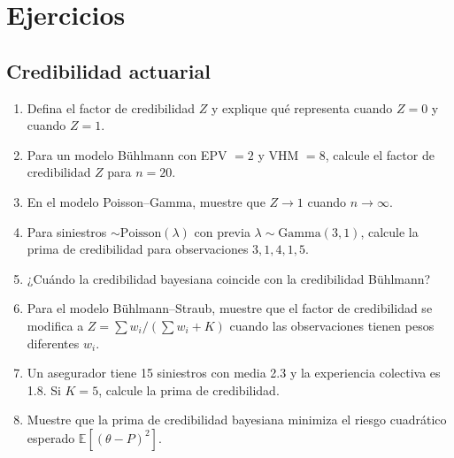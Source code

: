 \section{Ejercicios}

\subsection*{Credibilidad actuarial}
\begin{enumerate}
	\item[$\star$] Defina el factor de credibilidad $Z$ y explique qué representa cuando $Z = 0$ y cuando $Z = 1$.
	\item[$\star\star$] Para un modelo Bühlmann con EPV $= 2$ y VHM $= 8$, calcule el factor de credibilidad $Z$ para $n = 20$.
	\item[$\star\star\star$] En el modelo Poisson--Gamma, muestre que $Z \to 1$ cuando $n \to \infty$.
	\item[$\star\star$] Para siniestros $\sim \mathrm{Poisson}(\lambda)$ con previa $\lambda \sim \mathrm{Gamma}(3, 1)$, calcule la prima de credibilidad para observaciones $3, 1, 4, 1, 5$.
	\item[$\star\star$] ¿Cuándo la credibilidad bayesiana coincide con la credibilidad Bühlmann?
	\item[$\star\star\star$] Para el modelo Bühlmann--Straub, muestre que el factor de credibilidad se modifica a $Z = \sum w_i / (\sum w_i + K)$ cuando las observaciones tienen pesos diferentes $w_i$.
	\item[$\star$] Un asegurador tiene 15 siniestros con media 2.3 y la experiencia colectiva es 1.8.  Si $K = 5$, calcule la prima de credibilidad.
	\item[$\star\star\star$] Muestre que la prima de credibilidad bayesiana minimiza el riesgo cuadrático esperado $\mathbb{E}[(\theta - P)^2]$.
\end{enumerate}

